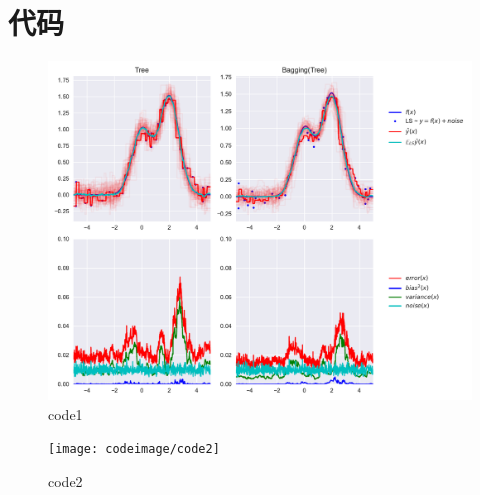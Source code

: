\section{代码}

\begin{PythonCode}\label{例1}
	
\end{PythonCode}

\begin{figure}[htbp]
	\centering
	\includegraphics[width=14cm]{codeimage/code1}
	\caption{code1}
	\label{code1}
\end{figure}

\begin{PythonCode}\label{例2}
	
\end{PythonCode}

\begin{figure}[htbp]
	\centering
	\texttt{[image: codeimage/code2]}
	\caption{code2}
	\label{code2}
\end{figure}

\begin{PythonCode}\label{例3}
	
\end{PythonCode}

